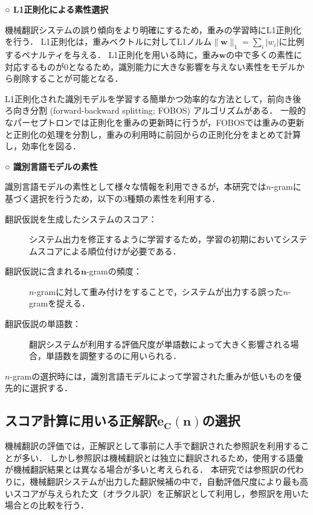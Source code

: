 \documentclass[japanese]{jnlp_1.4}
\begin{document}
\vspace{1\Cvs}
\noindent \textbf{○ L1正則化による素性選択}

\label{sec:l1}
機械翻訳システムの誤り傾向をより明確にするため，重みの学習時にL1正則化を行う．
L1正則化は，重みベクトルに対してL1ノルム$\|\boldsymbol{w}\|_1 = \sum_i |w_i|$に比例するペナルティを与える．
L1正則化を用いる時に，重み$\boldsymbol{w}$の中で多くの素性に対応するものが0となるため，識別能力に大きな影響を与えない素性をモデルから削除することが可能となる．

L1正則化された識別モデルを学習する簡単かつ効率的な方法として，前向き後ろ向き分割 (forward-backward splitting; FOBOS) アルゴリズムがある\cite{duchi09fobos}．
一般的なパーセプトロンでは正則化を重みの更新時に行うが，FOBOSでは重みの更新と正則化の処理を分割し，重みの利用時に前回からの正則化分をまとめて計算し，効率化を図る．

\vspace{1\Cvs}
\noindent \textbf{○ 識別言語モデルの素性}

識別言語モデルの素性として様々な情報を利用できるが，本研究では$n$-gramに基づく選択を行うため，以下の3種類の素性を利用する．
\begin{description}
\item[翻訳仮説を生成したシステムのスコア：] システム出力を修正するように学習するため，学習の初期においてシステムスコアによる順位付けが必要である．
\item[翻訳仮説に含まれる$\boldsymbol{n}$-gramの頻度：] $n$-gramに対して重み付けをすることで，システムが出力する誤った$n$-gramを捉える．
\item[翻訳仮説の単語数：] 翻訳システムが利用する評価尺度が単語数によって大きく影響される場合，単語数を調整するのに用いられる．
\end{description}

$n$-gramの選択時には，識別言語モデルによって学習された重みが低いものを優先的に選択する．


\subsection{スコア計算に用いる正解訳$\boldsymbol{e_{C}(n)}$の選択}
\label{sec:score-correct-trans}

機械翻訳の評価では，正解訳として事前に人手で翻訳された参照訳を利用することが多い．
しかし参照訳は機械翻訳とは独立に翻訳されるため，使用する語彙が機械翻訳結果とは異なる場合が多いと考えられる．
本研究では参照訳の代わりに，機械翻訳システムが出力した翻訳候補の中で，自動評価尺度により最も高いスコアが与えられた文（オラクル訳）を正解訳として利用し，参照訳を用いた場合との比較を行う．
\end{document}
